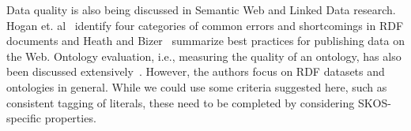 
Data quality is also being discussed in Semantic Web and Linked Data research. Hogan et. al~\cite{Hogan2010} identify four categories of common errors and shortcomings in RDF documents and Heath and Bizer~\cite{Heath2011} summarize best practices for publishing data on the Web. Ontology evaluation, i.e., measuring the quality of an ontology, has also been discussed extensively~\cite{Vrandecic2010}. However, the authors focus on RDF datasets and ontologies in general. While we could use some criteria suggested here, such as consistent tagging of literals, these need to be completed by considering SKOS-specific properties.


